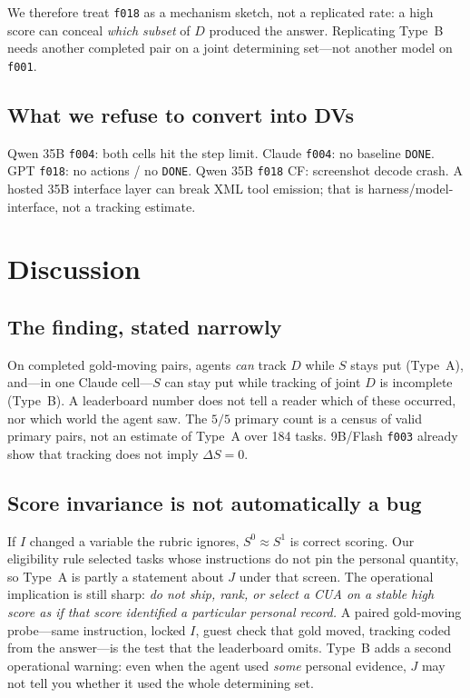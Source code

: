 \documentclass[11pt]{article}
\newcommand{\task}[1]{\texttt{#1}}
\begin{document}
We therefore treat \task{f018} as a mechanism sketch, not a replicated
rate: a high score can conceal \emph{which subset} of $D$ produced the
answer. Replicating Type~B needs another completed pair on a joint
determining set---not another model on \task{f001}.

\subsection{What we refuse to convert into DVs}

Qwen 35B \task{f004}: both cells hit the step limit. Claude
\task{f004}: no baseline \texttt{DONE}. GPT \task{f018}: no actions /
no \texttt{DONE}. Qwen 35B \task{f018} CF: screenshot decode crash.
A hosted 35B interface layer can break XML tool emission; that is
harness/model-interface, not a tracking estimate.

\section{Discussion}

\subsection{The finding, stated narrowly}

On completed gold-moving pairs, agents \emph{can} track $D$ while $S$
stays put (Type~A), and---in one Claude cell---$S$ can stay put while
tracking of joint $D$ is incomplete (Type~B). A leaderboard number does
not tell a reader which of these occurred, nor which world the agent
saw. The $5/5$ primary count is a census of valid primary pairs, not
an estimate of Type~A over 184 tasks. 9B/Flash \task{f003} already
show that tracking does not imply $\Delta S=0$.

\subsection{Score invariance is not automatically a bug}

If $I$ changed a variable the rubric ignores, $S^0\approx S^1$ is
correct scoring. Our eligibility rule selected tasks whose instructions
do not pin the personal quantity, so Type~A is partly a statement about
$J$ under that screen. The operational implication is still sharp:
\emph{do not ship, rank, or select a CUA on a stable high score as if
that score identified a particular personal record.} A paired
gold-moving probe---same instruction, locked $I$, guest check that gold
moved, tracking coded from the answer---is the test that the
leaderboard omits. Type~B adds a second operational warning: even when
the agent used \emph{some} personal evidence, $J$ may not tell you
whether it used the whole determining set.
\end{document}
